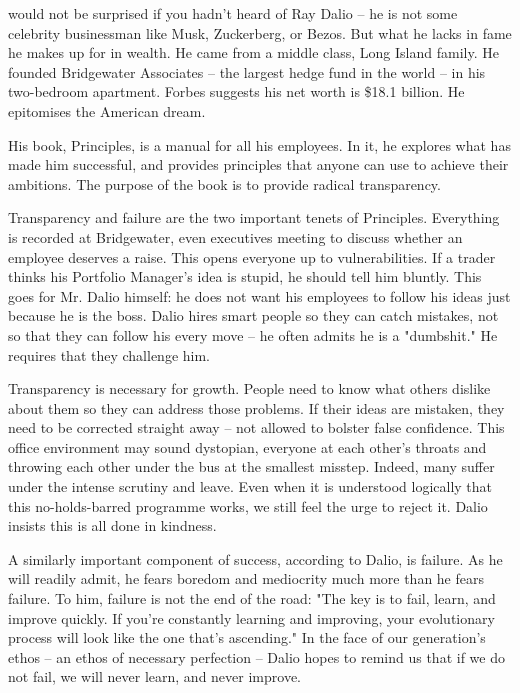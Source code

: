 \label{ch:principles}

would not be surprised if you hadn't heard of Ray Dalio -- he is not
   some celebrity businessman like Musk, Zuckerberg, or Bezos. But what he
   lacks in fame he makes up for in wealth. He came from a middle
   class, Long Island family. He founded Bridgewater Associates -- the
   largest hedge fund in the world -- in his two-bedroom apartment. Forbes
   suggests his net worth is \$18.1 billion. He epitomises the American
   dream.

   His book, Principles, is a manual for all his employees. In it, he
   explores what has made him successful, and provides principles that
   anyone can use to achieve their ambitions. The
   purpose of the book is to provide radical transparency.

   Transparency and failure are the two important tenets of Principles.
   Everything is recorded at Bridgewater, even executives meeting to
   discuss whether an employee deserves a raise. This opens everyone up
   to vulnerabilities. If a trader thinks his Portfolio Manager's idea is
   stupid, he should tell him bluntly. This goes for Mr. Dalio himself: he
   does not want his employees to follow his ideas just because he is the
   boss. Dalio hires smart people so they can catch mistakes, not so that
   they can follow his every move -- he often admits he is a "dumbshit."
   He requires that they challenge him.

   Transparency is necessary for growth. People need to know what others
   dislike about them so they can address those problems. If their ideas
   are mistaken, they need to be corrected straight away -- not allowed to
   bolster false confidence. This office environment may sound dystopian,
   everyone at each other's throats and throwing each other under the bus
   at the smallest misstep. Indeed, many suffer under the intense scrutiny
   and leave. Even when it is understood logically that this no-holds-barred programme works, we still feel the urge to reject
   it. Dalio insists this is all done in kindness.

   A similarly important component of success, according to Dalio, is
   failure. As he will readily admit, he fears boredom and mediocrity much
   more than he fears failure. To him, failure is not the end of the road:
   "The key is to fail, learn, and improve quickly. If you're constantly
   learning and improving, your evolutionary process will look like the
   one that's ascending." In the face of our generation's ethos -- an
   ethos of necessary perfection -- Dalio hopes to remind us that if we do
   not fail, we will never learn, and never improve.

